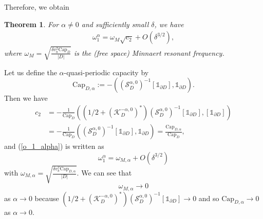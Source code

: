 \documentclass[11pt]{article}
\numberwithin{equation}{section}
\newtheorem{thm}{Theorem}[section]
\def\capacity{{\mathrm{Cap}}}
\newcommand\1{{\ensuremath {\mathds 1} }}
\newcommand{\eqnref}[1]{(\ref {#1})}
\begin{document}
{{Therefore, we obtain
\begin{thm}\label{approx_thm} For $\alpha \ne 0$ and sufficiently small $\delta$, we have
\begin{align}
\omega_1^\alpha= \omega_M \sqrt{c_2} + O(\delta^{3/2}), \label{o_1_alpha}
\end{align}
where $\omega_M= \sqrt{ \frac{\delta v_b^2 \capacity_D }{ |D|} } $ is the (free space) Minnaert resonant frequency.
\end{thm}

 
 
 Let us define the $\alpha$-quasi-periodic capacity by 
 \begin{equation}\label{capacityalpha}  \capacity_{D,\alpha}:= -  ((\mathcal{S}_D^{\alpha,0})^{-1} [\1_{\partial D}], \1_{\partial D}).
 \end{equation}
  Then we have 
\begin{align*} c_2 &= - \frac{1}{\capacity_D} ( \left( 1/2 +( \mathcal{K}_D^{-\alpha,0})^*\right)(\mathcal{S}_D^{\alpha,0})^{-1} [\1_{\partial D}], [\1_{\partial D}])\\
&= - \frac{1}{\capacity_D} ((\mathcal{S}_D^{\alpha,0})^{-1} [\1_{\partial D}], \1_{\partial D}) = \frac{\capacity_{D,\alpha}}{\capacity_D},\end{align*}
and \eqnref{o_1_alpha} is written as
$$ \omega_1^\alpha = \omega_{M,\alpha} + O(\delta^{3/2})$$
with $\omega_{M,\alpha}= \sqrt{ \frac{\delta v_b^2 \capacity_{D,\alpha} }{ |D|} }.$ We can see that $$\omega_{M,\alpha}\rightarrow 0$$ as $\alpha\to 0$   because 
 $ \left( 1/2 +( \mathcal{K}_D^{-\alpha,0})^*\right)(\mathcal{S}_D^{\alpha,0})^{-1} [\1_{\partial D}] \rightarrow 0$  and  so $\capacity_{D,\alpha}\rightarrow 0$ as $\alpha\rightarrow0$.

}}
\end{document}

